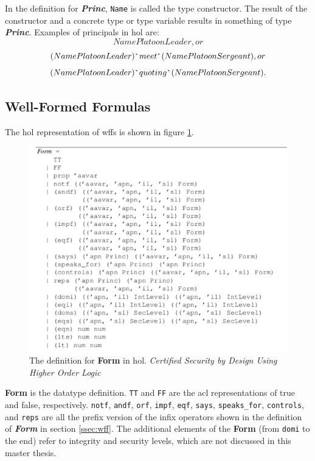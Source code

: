 \documentclass[../../main/main.tex]{subfiles}
\begin{document}
In the definition for  \textbf{\textit{Princ}}, \texttt{Name} is called the type constructor.  The result of the constructor and a concrete type or type variable results in something of type \textbf{\textit{Princ}}.  Examples of principals in \gls{hol} are:
\[Name PlatoonLeader, or \]
\[(Name PlatoonLeader) \texttt{\textasciigrave} meet \texttt{\textasciigrave} (Name PlatoonSergeant), or \]
\[(Name PlatoonLeader) \texttt{\textasciigrave} quoting \texttt{\textasciigrave} (Name PlatoonSergeant). \]

\subsection{Well-Formed Formulas}
The \gls{hol} representation of \gls{wff}s is shown in figure \ref{FormACL}.

\begin{figure}[h]
\centering
\includegraphics[width=\textwidth]{../figures/FormACL}
\caption{\label{FormACL}The definition for \textbf{Form} in \gls{hol}.   \textit{Certified Security by Design Using Higher Order Logic}\cite{certmanual}}
\end{figure}

\textbf{Form} is the datatype definition.  \texttt{TT}  and \texttt{FF} are the \gls{acl} representations of true and false, respectively.  \texttt{notf}, \texttt{andf}, \texttt{orf}, \texttt{impf}, \texttt{eqf}, \texttt{says}, \texttt{speaks_for}, \texttt{controls}, and \texttt{reps} are all the prefix version of the infix operators shown in the definition of \textbf{\textit{Form}} in section \ref{ssec:wff}.  The additional elements of the \textbf{Form} (from \texttt{domi} to the end) refer to integrity and security levels, which are not discussed in this master thesis. 
\end{document}
